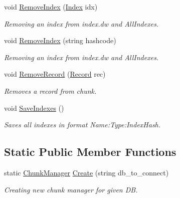 \begin{DoxyCompactItemize}
\item 
void \hyperlink{class_dwarf_d_b_1_1_chunk_manager_1_1_chunk_manager_a66cad77309d9d5a6d10a364f2e705b47}{RemoveIndex} (\hyperlink{class_dwarf_d_b_1_1_data_structures_1_1_index}{Index} idx)
\begin{DoxyCompactList}\small\item\em Removing an index from index.dw and AllIndexes. \item\end{DoxyCompactList}\item 
void \hyperlink{class_dwarf_d_b_1_1_chunk_manager_1_1_chunk_manager_a73b94219d8eb3eae9eb06029d15abcaf}{RemoveIndex} (string hashcode)
\begin{DoxyCompactList}\small\item\em Removing an index from index.dw and AllIndexes. \item\end{DoxyCompactList}\item 
void \hyperlink{class_dwarf_d_b_1_1_chunk_manager_1_1_chunk_manager_ae75710040c6048aebd07ec5161945386}{RemoveRecord} (\hyperlink{class_dwarf_d_b_1_1_data_structures_1_1_record}{Record} rec)
\begin{DoxyCompactList}\small\item\em Removes a record from chunk. \item\end{DoxyCompactList}\item 
void \hyperlink{class_dwarf_d_b_1_1_chunk_manager_1_1_chunk_manager_af8099b5fa9a87264defdb4687e9851b0}{SaveIndexes} ()
\begin{DoxyCompactList}\small\item\em Saves all indexes in format Name:Type:IndexHash. \item\end{DoxyCompactList}\end{DoxyCompactItemize}
\subsection*{Static Public Member Functions}
\begin{DoxyCompactItemize}
\item 
static \hyperlink{class_dwarf_d_b_1_1_chunk_manager_1_1_chunk_manager}{ChunkManager} \hyperlink{class_dwarf_d_b_1_1_chunk_manager_1_1_chunk_manager_ac75fd758d8a6f1579eb15ac3f398c1ea}{Create} (string db\_\-to\_\-connect)
\begin{DoxyCompactList}\small\item\em Creating new chunk manager for given DB. \item\end{DoxyCompactList}\end{DoxyCompactItemize}
